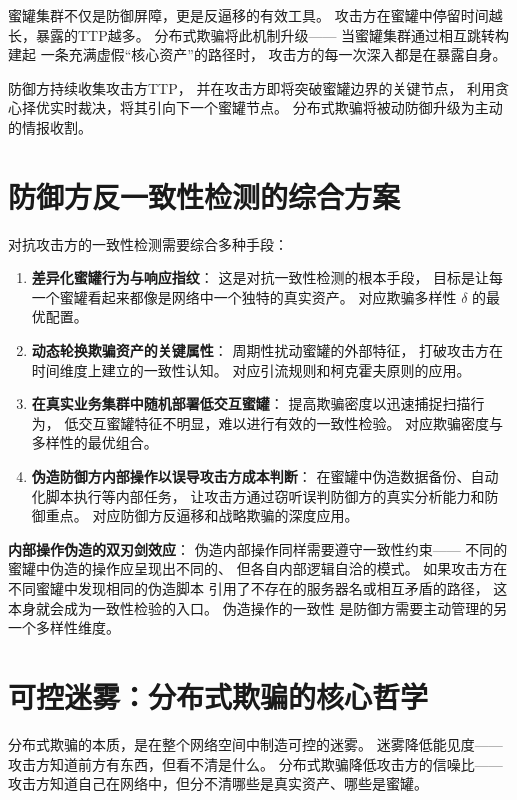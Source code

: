 \documentclass[11pt,a4paper]{article}
\begin{document}
蜜罐集群不仅是防御屏障，更是反逼移的有效工具。
攻击方在蜜罐中停留时间越长，暴露的TTP越多。
分布式欺骗将此机制升级——
当蜜罐集群通过相互跳转构建起
一条充满虚假“核心资产”的路径时，
攻击方的每一次深入都是在暴露自身。

防御方持续收集攻击方TTP，
并在攻击方即将突破蜜罐边界的关键节点，
利用贪心择优实时裁决，将其引向下一个蜜罐节点。
分布式欺骗将被动防御升级为主动的情报收割。

\section{防御方反一致性检测的综合方案}

对抗攻击方的一致性检测需要综合多种手段：

\begin{enumerate}[label=(\arabic*)]
    \item \textbf{差异化蜜罐行为与响应指纹}：
          这是对抗一致性检测的根本手段，
          目标是让每一个蜜罐看起来都像是网络中一个独特的真实资产。
          对应欺骗多样性 \(\delta\) 的最优配置。
    \item \textbf{动态轮换欺骗资产的关键属性}：
          周期性扰动蜜罐的外部特征，
          打破攻击方在时间维度上建立的一致性认知。
          对应引流规则和柯克霍夫原则的应用。
    \item \textbf{在真实业务集群中随机部署低交互蜜罐}：
          提高欺骗密度以迅速捕捉扫描行为，
          低交互蜜罐特征不明显，难以进行有效的一致性检验。
          对应欺骗密度与多样性的最优组合。
    \item \textbf{伪造防御方内部操作以误导攻击方成本判断}：
          在蜜罐中伪造数据备份、自动化脚本执行等内部任务，
          让攻击方通过窃听误判防御方的真实分析能力和防御重点。
          对应防御方反逼移和战略欺骗的深度应用。
\end{enumerate}

\textbf{内部操作伪造的双刃剑效应}：
伪造内部操作同样需要遵守一致性约束——
不同的蜜罐中伪造的操作应呈现出不同的、
但各自内部逻辑自洽的模式。
如果攻击方在不同蜜罐中发现相同的伪造脚本
引用了不存在的服务器名或相互矛盾的路径，
这本身就会成为一致性检验的入口。
伪造操作的一致性
是防御方需要主动管理的另一个多样性维度。

\section{可控迷雾：分布式欺骗的核心哲学}

分布式欺骗的本质，是在整个网络空间中制造可控的迷雾。
迷雾降低能见度——攻击方知道前方有东西，但看不清是什么。
分布式欺骗降低攻击方的信噪比——
攻击方知道自己在网络中，但分不清哪些是真实资产、哪些是蜜罐。
\end{document}
